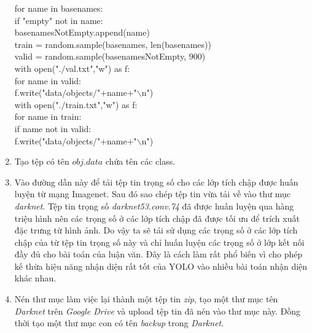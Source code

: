 \begin{enumerate}
{{		for name in basenames:\\
		    \tab if "empty" not in name:\\
		    \tab \tab basenamesNotEmpty.append(name)\\

		train = random.sample(basenames, len(basenames))\\
		valid = random.sample(basenamesNotEmpty, 900)\\

		with open(".$/$val.txt","w") as f:\\
    		\tab for name in valid:\\
        		\tab \tab f.write("data$/$objects$/$"+name+"$\backslash$n")\\
        
		with open(".$/$train.txt","w") as f:\\
			\tab for name in train:\\
	        	\tab if name not in valid:\\
		        \tab \tab f.write("data$/$objects$/$"+name+"$\backslash$n")\\
	}
}

	\item Tạo tệp có tên $obj.data$ chứa tên các class.

\noindent{}

	\item Vào đường dẫn này để tải tệp tin trọng số cho các lớp tích chập được huấn luyện từ mạng Imagenet. Sau đó sao chép tệp tin vừa tải về vào thư mục \emph{darknet}. Tệp tin trọng số \emph{darknet53.conv.74} đã được huấn luyện qua hàng triệu hình nên các trọng số ở các lớp tích chập đã được tối ưu để trích xuất đặc trưng từ hình ảnh. Do vậy ta sẽ tái sử dụng các trọng số ở các lớp tích chập của từ tệp tin trọng số này và chỉ huấn luyện các trọng số ở lớp kết nối đầy đủ cho bài toán của luận văn. Đây là cách làm rất phổ biến vì cho phép kế thừa hiệu năng nhận diện rất tốt của YOLO vào nhiều bài toán nhận diện khác nhau.
	
\noindent{}	
	
	\item Nén thư mục làm việc lại thành một tệp tin \emph{zip}, tạo một thư mục tên \emph{Darknet} trên \emph{Google Drive} và upload tệp tin đã nén vào thư mục này. Đồng thời tạo một thư mục con có tên \emph{backup} trong \emph{Darknet}.
	

\end{enumerate}
